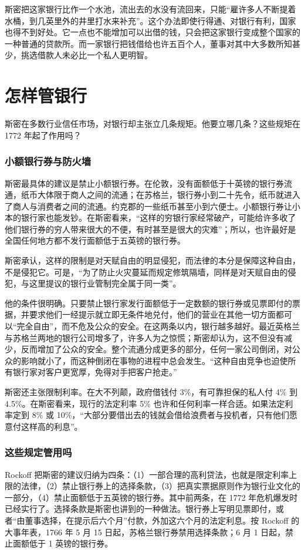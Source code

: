 斯密把这家银行比作一个水池，流出去的水没有流回来，只能“雇许多人不断提着水桶，到几英里外的井里打水来补充”。这个办法即使行得通、对银行有利，国家也得不到好处。它一点也不能增加可以出借的钱，只会把这家银行变成整个国家的一种普通的贷款所。而一家银行把钱借给也许五百个人，董事对其中大多数所知甚少，挑选借款人未必比一个私人更明智\cite{smith1776}。

\section{怎样管银行}\label{sec:smith-regulation}

斯密在多数行业信任市场，对银行却主张立几条规矩。他要立哪几条？这些规矩在 1772 年起了作用吗？

\subsubsection{小额银行券与防火墙}
斯密最具体的建议是禁止小额银行券。在伦敦，没有面额低于十英镑的银行券流通，纸币大体限于商人之间的流通；在苏格兰，银行券小到二十先令，纸币就进入了商人与消费者之间的流通\cite{smith1776}。约克郡的一些纸币甚至小到六便士。小额银行券让小本的银行家也能发钞。在斯密看来，“这样的穷银行家经常破产，可能给许多收了他们银行券的穷人带来很大的不便，有时甚至是很大的灾难”；所以，也许最好是全国任何地方都不发行面额低于五英镑的银行券\cite{smith1776}。

斯密承认，这样的限制是对天赋自由的明显侵犯，而法律的本分是保障这种自由，不是侵犯它。可是，“为了防止火灾蔓延而规定修筑隔墙，同样是对天赋自由的侵犯，与这里提议的银行业管制完全属于同一类”\cite{smith1776}。

他的条件很明确。只要禁止银行家发行面额低于一定数额的银行券或见票即付的票据，并要求他们一经提示就立即无条件地兑付，他们的营业在其他一切方面都可以“完全自由”，而不危及公众的安全\cite{smith1776}。在这两条以内，银行越多越好。最近英格兰与苏格兰两地的银行公司增多了，许多人为之惊慌；斯密却认为，这不但没有减少，反而增加了公众的安全。整个流通分成更多的部分，任何一家公司倒闭，对公众的影响就小了，而这种倒闭在事物的进程中总会发生。“这种自由竞争也迫使所有银行家对客户更宽厚，免得对手把客户抢走。”\cite{smith1776}

斯密还主张限制利率。在大不列颠，政府借钱付 3\%，有可靠担保的私人付 4\% 到 4.5\%。在斯密看来，现行的法定利率 5\% 也许和任何利率一样合适。如果法定利率定到 8\% 或 10\%，“大部分要借出去的钱就会借给浪费者与投机者，只有他们愿意付这样高的利息”\cite{smith1776}。

\subsubsection{这些规定管用吗}
Rockoff 把斯密的建议归纳为四条：（1）一部合理的高利贷法，也就是限定利率上限的法律，（2）禁止银行券上的选择条款，（3）把真实票据原则作为银行业文化的一部分，（4）禁止面额低于五英镑的银行券。其中前两条，在 1772 年危机爆发时已经实行了\cite{rockoff2009}。选择条款是斯密也讲到的一种做法。银行券上写明见票即付，或者“由董事选择，在提示后六个月”付款，外加这六个月的法定利息\cite{smith1776}。按 Rockoff 的大事年表，1766 年 5 月 15 日起，苏格兰银行券禁用选择条款；6 月 1 日起，禁止面额低于 1 英镑的银行券\cite{rockoff2009}。

